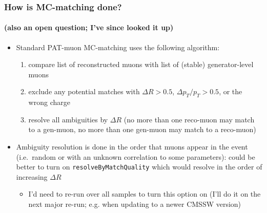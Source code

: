 \documentclass[compress]{beamer}
\begin{document}
\begin{frame}
\end{frame}

\begin{frame}
\frametitle{How is MC-matching done?}
\framesubtitle{(also an open question; I've since looked it up)}
\begin{itemize}
\item Standard PAT-muon MC-matching uses the following algorithm:
\begin{enumerate}
\item compare list of reconstructed muons with list of (stable) generator-level muons
\item exclude any potential matches with $\Delta R > 0.5$, $\Delta p_T/p_T > 0.5$, or the wrong charge
\item resolve all ambiguities by $\Delta R$ (no more than one
  reco-muon may match to a gen-muon, no more than one gen-muon may
  match to a reco-muon)
\end{enumerate}

\item Ambiguity resolution is done in the order that muons appear in
  the event (i.e.\ random or with an unknown correlation to some
  parameters): could be better to turn on {\tt resolveByMatchQuality}
  which would resolve in the order of increasing $\Delta R$
\begin{itemize}
\item I'd need to re-run over all samples to turn this option on (I'll
  do it on the next major re-run; e.g. when updating to a newer CMSSW
  version)
\end{itemize}
\end{itemize}
\end{frame}
\end{document}
